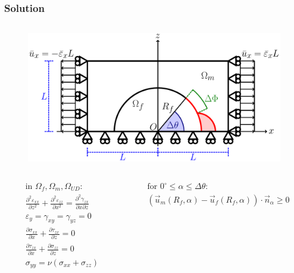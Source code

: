 \documentclass[first,firstsupp,lastsupp,last,hyperref,table]{ETHclass}
\begin{document}
\begin{frame}
\frametitle{\vspace{0.4cm}\small Solution}
\vspace{-1.1cm}
\centering
\begin{columns}
\begin{column}{0.6\textwidth}
\begin{figure}
\includegraphics[width=0.825\columnwidth]{RUC.pdf}
\end{figure}
\vspace{-1cm}
\begin{columns}
\begin{column}{0.3\columnwidth}
\tiny
\begin{equation*}
\begin{aligned}
&\text{in }\Omega_{f}, \Omega_{m}, \Omega_{UD}:\\
&\frac{\partial^{2}\varepsilon_{xx}}{\partial z^{2}}+\frac{\partial^{2}\varepsilon_{zz}}{\partial x^{2}}=\frac{\partial^{2}\gamma_{zx}}{\partial x\partial z}\\
&\varepsilon_{y}=\gamma_{xy}=\gamma_{yz}=0\\
&\frac{\partial\sigma_{xx}}{\partial x}+\frac{\partial\tau_{zx}}{\partial z} = 0\\
&\frac{\partial\tau_{zx}}{\partial x}+\frac{\partial\sigma_{zz}}{\partial z} = 0\\
&\sigma_{yy}=\nu\left(\sigma_{xx}+\sigma_{zz}\right)\\
\end{aligned}
\end{equation*}
\end{column}
\begin{column}{0.7\columnwidth}
\tiny
\begin{equation*}
\begin{aligned}
&\text{for } 0^{\circ}\leq\alpha\leq\Delta\theta:\\
&\left(\overrightarrow{u}_{m}\left(R_{f},\alpha\right)-\overrightarrow{u}_{f}\left(R_{f},\alpha\right)\right)\cdot\overrightarrow{n}_{\alpha}\geq 0\\

\end{aligned}
\end{equation*}
\end{column}
\end{columns}
\end{column}
\end{columns}
\end{frame}
\end{document}
